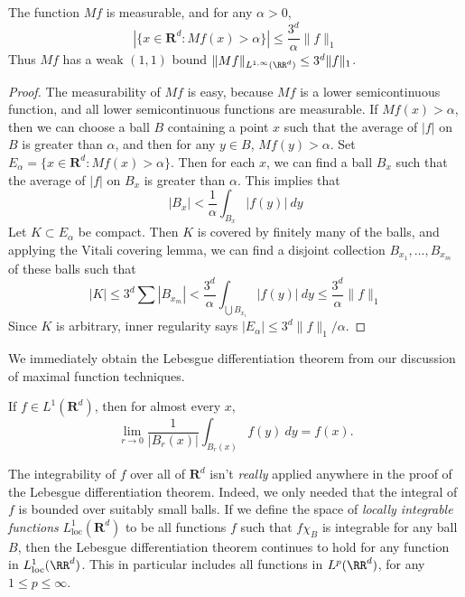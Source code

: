 \begin{theorem}
    The function $Mf$ is measurable, and for any $\alpha > 0$,
    \[ |\{ x \in \mathbf{R}^d: Mf(x) > \alpha \}| \leq \frac{3^d}{\alpha} \| f \|_1 \]
    Thus $Mf$ has a weak $(1,1)$ bound $\| Mf \|_{L^{1,\infty}(\RR^d)} \leq 3^d \| f \|_1$.
\end{theorem}
\begin{proof}
    The measurability of $Mf$ is easy, because $Mf$ is a lower semicontinuous function, and all lower semicontinuous functions are measurable. If $Mf(x) > \alpha$, then we can choose a ball $B$ containing a point $x$ such that the average of $|f|$ on $B$ is greater than $\alpha$, and then for any $y \in B$, $Mf(y) > \alpha$. Set $E_\alpha = \{ x \in \mathbf{R}^d: Mf(x) > \alpha \}$. Then for each $x$, we can find a ball $B_x$ such that the average of $|f|$ on $B_x$ is greater than $\alpha$. This implies that
    \[ |B_x| < \frac{1}{\alpha} \int_{B_x} |f(y)|\ dy \]
    Let $K \subset E_\alpha$ be compact. Then $K$ is covered by finitely many of the balls, and applying the Vitali covering lemma, we can find a disjoint collection $B_{x_1}, \dots, B_{x_m}$ of these balls such that
    \[ |K| \leq 3^d \sum |B_{x_m}| < \frac{3^d}{\alpha} \int_{\bigcup B_{x_i}} |f(y)|\ dy \leq \frac{3^d}{\alpha} \|f\|_1 \]
    Since $K$ is arbitrary, inner regularity says $|E_\alpha| \leq 3^d \| f \|_1/\alpha$.
\end{proof}

We immediately obtain the Lebesgue differentiation theorem from our discussion of maximal function techniques.

\begin{corollary}
    If $f \in L^1(\mathbf{R}^d)$, then for almost every $x$,
    \[ \lim_{r \to 0} \frac{1}{|B_r(x)|} \int_{B_r(x)} f(y)\ dy = f(x). \]
\end{corollary}

The integrability of $f$ over all of $\mathbf{R}^d$ isn't {\it really} applied anywhere in the proof of the Lebesgue differentiation theorem. Indeed, we only needed that the integral of $f$ is bounded over suitably small balls. If we define the space of \emph{locally integrable functions} $L^1_{\text{loc}}(\mathbf{R}^d)$ to be all functions $f$ such that $f \chi_B$ is integrable for any ball $B$, then the Lebesgue differentiation theorem continues to hold for any function in $L^1_{\text{loc}}(\RR^d)$. This in particular includes all functions in $L^p(\RR^d)$, for any $1 \leq p \leq \infty$.

